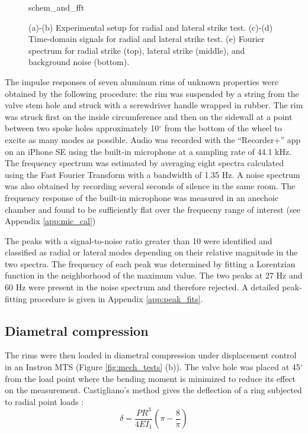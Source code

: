 \documentclass[../thesis.tex]{subfiles}
\begin{document}
\begin{figure}
\centering
{schem_and_fft}
\caption{(a)-(b) Experimental setup for radial and lateral strike test. (c)-(d) Time-domain signals for radial and lateral strike test. (e) Fourier spectrum for radial strike (top), lateral strike (middle), and background noise (bottom).}
\label{fig:schem}
\end{figure}

The impulse responses of seven aluminum rims of unknown properties were obtained by the following procedure: the rim was suspended by a string from the valve stem hole and struck with a screwdriver handle wrapped in rubber. The rim was struck first on the inside circumference and then on the sidewall at a point between two spoke holes approximately 10$^{\circ}$ from the bottom of the wheel to excite as many modes as possible. Audio was recorded with the ``Recorder+'' app on an iPhone SE using the built-in microphone at a sampling rate of 44.1 kHz. The frequency spectrum was estimated by averaging eight spectra calculated using the Fast Fourier Transform with a bandwidth of 1.35 Hz. A noise spectrum was also obtained by recording several seconds of silence in the same room. The frequency response of the built-in microphone was measured in an anechoic chamber and found to be sufficiently flat over the frequecny range of interest (see Appendix \ref{app:mic_cal})

The peaks with a signal-to-noise ratio greater than 10 were identified and classified as radial or lateral modes depending on their relative magnitude in the two spectra. The frequency of each peak was determined by fitting a Lorentzian function in the neighborhood of the maximum value. The two peaks at 27 Hz and 60 Hz were present in the noise spectrum and therefore rejected. A detailed peak-fitting procedure is given in Appendix \ref{app:peak_fits}.

\subsection{Diametral compression}
The rims were then loaded in diametral compression under displacement control in an Instron MTS (Figure \ref{fig:mech_tests} (b)). The valve hole was placed at 45$^{\circ}$ from the load point where the bending moment is minimized to reduce its effect on the measurement. Castigliano's method gives the deflection of a ring subjected to radial point loads \cite{Timoshenko1961}:
  \begin{equation}\label{eq:def_rad}
  \delta = \frac{PR^3}{4EI_1} \left(\pi-\frac{8}{\pi} \right)
  \end{equation}
\end{document}
